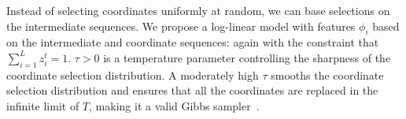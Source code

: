 \documentclass{article}
\begin{document}
Instead of selecting coordinates uniformly at random,
we can base selections on the intermediate sequences. We propose a log-linear model with features $\phi_i$ based on the intermediate and coordinate sequences:
again with the constraint that $\sum_{i=1}^L z_i^t = 1$.
$\tau > 0$ is a temperature parameter controlling the sharpness of the coordinate selection distribution. A moderately high $\tau$ smooths the coordinate selection distribution and ensures that all the coordinates are replaced in the infinite limit of $T$, making it a valid Gibbs sampler~\citep{levine2006optimizing}.
\end{document}
